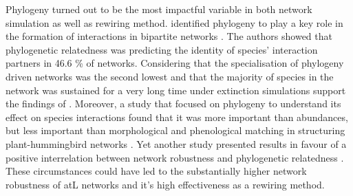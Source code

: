 \documentclass[12pt,a4paper]{article}
\begin{document}
Phylogeny turned out to be the most impactful variable in both network simulation as well as rewiring method. \citeauthor{Rezende2007} identified phylogeny to play a key role in the formation of interactions in bipartite networks \parencite{Rezende2007}. The authors showed that phylogenetic relatedness was predicting the identity of species' interaction partners in 46.6 \% of networks. Considering that the specialisation of phylogeny driven networks was the second lowest and that the majority of species in the network was sustained for a very long time under extinction simulations support the findings of \citeauthor{Rezende2007}. Moreover, a study that focused on phylogeny to understand its effect on species interactions found that it was more important than abundances, but less important than morphological and phenological matching in structuring plant-hummingbird networks \parencite{Vitoria2018}. Yet another study presented results in favour of a positive interrelation between network robustness and phylogenetic relatedness \parencite{Montesinos-Navarro2019}. These circumstances could have led to the substantially higher network robustness of atL networks and it's high effectiveness as a rewiring method. \paragraph{}

%
%
%
% 
%
%
\end{document}

